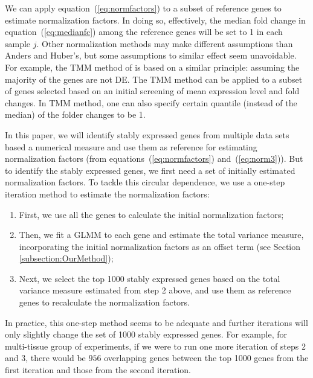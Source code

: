 \documentclass[letterpaper,12pt]{article}
\begin{document}
We can apply equation~(\ref{eq:normfactors}) to a subset of reference genes to
estimate normalization factors.  In doing so,  effectively, the median fold
change in equation~(\ref{eq:medianfc}) among the reference genes will be set
to 1 in each sample $j$.
Other normalization methods may make different assumptions
than Anders and Huber's, but some assumptions to similar effect seem
unavoidable.  For example, the TMM method of \citet{robinson2010scaling} is
based on a similar principle: assuming the majority of the genes are not DE.
The TMM method can be applied to a subset of genes selected based on an
initial screening of mean expression level and fold changes. In TMM method,
one can also specify certain quantile (instead of the median) of the folder
changes to be 1.

In this paper, we will identify stably expressed genes from multiple data sets
based a numerical measure and use them as reference for estimating
normalization factors (from equations~(\ref{eq:normfactors}) and~(\ref{eq:norm3})). 
But to identify the stably expressed genes, we first
need a set
of initially estimated normalization factors.  To tackle this circular
dependence, we use a one-step iteration method to estimate the normalization
factors: 
\begin{enumerate}
    \item
	First, we use all the genes to calculate the initial normalization factors; 
    \item
	Then, we fit a GLMM to each gene and estimate the total variance measure, incorporating the initial normalization factors as
	an offset term (see Section \ref{subsection:OurMethod}); 
    \item
	Next, we select the top 1000 stably expressed genes based on the total
	variance measure estimated from step 2 above, and use them as
	reference genes to recalculate the normalization factors. 
\end{enumerate}
In practice, this one-step method seems to be adequate and further iterations
will only slightly change the set of 1000 stably expressed genes.  For
example, for multi-tissue group of experiments, if we were to run one more
iteration of steps 2 and 3, there would be $956$ overlapping genes between
the top 1000 genes from the first iteration and those from the second
iteration.


\end{document}
